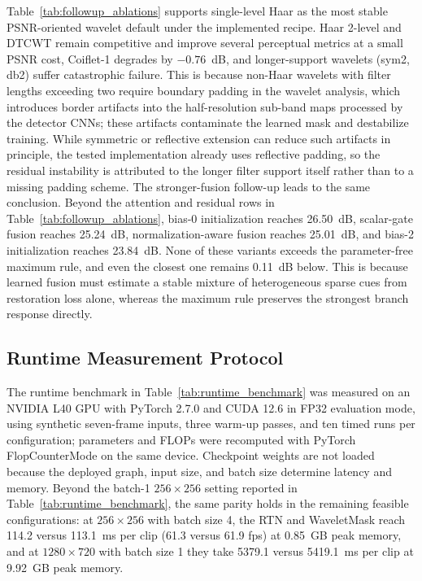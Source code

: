 \documentclass[applsci,article,submit,pdftex,moreauthors]{Definitions/mdpi}
\begin{document}
Table~\ref{tab:followup_ablations} supports single-level Haar as the most stable PSNR-oriented wavelet default under the implemented recipe. Haar 2-level and DTCWT remain competitive and improve several perceptual metrics at a small PSNR cost, Coiflet-1 degrades by $-0.76$~dB, and longer-support wavelets (sym2, db2) suffer catastrophic failure. This is because non-Haar wavelets with filter lengths exceeding two require boundary padding in the wavelet analysis, which introduces border artifacts into the half-resolution sub-band maps processed by the detector CNNs; these artifacts contaminate the learned mask and destabilize training. While symmetric or reflective extension can reduce such artifacts in principle, the tested implementation already uses reflective padding, so the residual instability is attributed to the longer filter support itself rather than to a missing padding scheme. The stronger-fusion follow-up leads to the same conclusion. Beyond the attention and residual rows in Table~\ref{tab:followup_ablations}, bias-0 initialization reaches 26.50~dB, scalar-gate fusion reaches 25.24~dB, normalization-aware fusion reaches 25.01~dB, and bias-2 initialization reaches 23.84~dB. None of these variants exceeds the parameter-free maximum rule, and even the closest one remains 0.11~dB below. This is because learned fusion must estimate a stable mixture of heterogeneous sparse cues from restoration loss alone, whereas the maximum rule preserves the strongest branch response directly.

\subsection{Runtime Measurement Protocol}\label{subsec:runtime_protocol}

The runtime benchmark in Table~\ref{tab:runtime_benchmark} was measured on an NVIDIA L40 GPU with PyTorch 2.7.0 and CUDA 12.6 in FP32 evaluation mode, using synthetic seven-frame inputs, three warm-up passes, and ten timed runs per configuration; parameters and FLOPs were recomputed with PyTorch FlopCounterMode on the same device. Checkpoint weights are not loaded because the deployed graph, input size, and batch size determine latency and memory. Beyond the batch-1 $256\times256$ setting reported in Table~\ref{tab:runtime_benchmark}, the same parity holds in the remaining feasible configurations: at $256\times256$ with batch size 4, the RTN and WaveletMask reach 114.2 versus 113.1~ms per clip (61.3 versus 61.9 fps) at 0.85~GB peak memory, and at $1280\times720$ with batch size 1 they take 5379.1 versus 5419.1~ms per clip at 9.92~GB peak memory.
\end{document}
